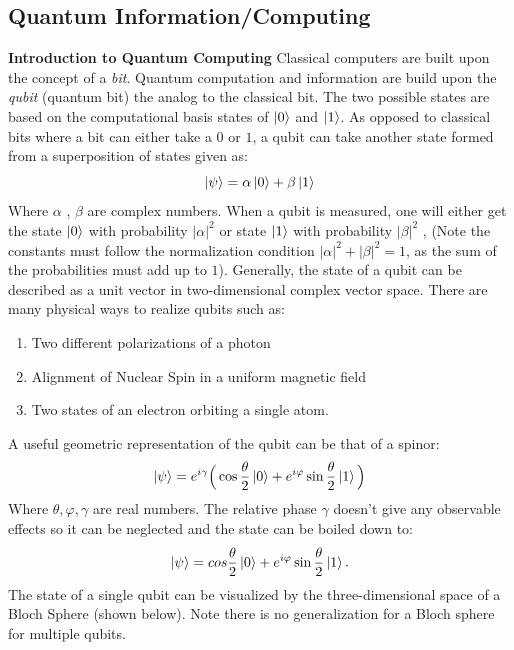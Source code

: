 \subsection{Quantum Information/Computing}
\textbf{Introduction to Quantum Computing} \newline
Classical computers are built upon the concept of a \textit{bit}. Quantum computation and information are build upon the \textit{qubit} (quantum bit) the analog to the classical bit. The two possible states are based on the computational basis states of $\ket{0}$ and $\ket{1}$. As opposed to classical bits where a bit can either take a $0$ or $1$, a qubit can take another state formed from a superposition of states given as:
\begin{equation}
    \ket{\psi} = \alpha \ket{0} + \beta \ket{1}
\end{equation}
Where $\alpha$ , $\beta$ are complex numbers. When a qubit is measured, one will either get the state $\ket{0}$ with probability $|\alpha|^2$ or state $\ket{1}$ with probability $|\beta|^2$ , (Note the constants must follow the normalization condition $|\alpha|^2 + |\beta|^2 = 1$, as the sum of the probabilities must add up to $1$). Generally, the state of a qubit can be described as a unit vector in two-dimensional complex vector space. \newline
There are many physical ways to realize qubits such as:
\begin{enumerate}
    \item Two different polarizations of a photon
    \item Alignment of Nuclear Spin in a uniform magnetic field
    \item Two states of an electron orbiting a single atom. 
\end{enumerate}
A useful geometric representation of the qubit can be that of a spinor:
\begin{equation}
    \ket{\psi} = e^{i\gamma} \Big( \cos \frac{\theta}{2} \ket{0} + e^{i\varphi} \sin \frac{\theta}{2} \ket{1} \Big)
\end{equation}
Where $\theta, \varphi, \gamma$ are real numbers. The relative phase $\gamma$ doesn't give any observable effects so it can be neglected and the state can be boiled down to: 
\begin{equation}
   \ket{\psi} =  cos \frac{\theta}{2} \ket{0} + e^{i\varphi} \sin \frac{\theta}{2} \ket{1}. 
\end{equation}
The state of a single qubit can be visualized by the three-dimensional space of a Bloch Sphere (shown below). Note there is no generalization for a Bloch sphere for multiple qubits. 
